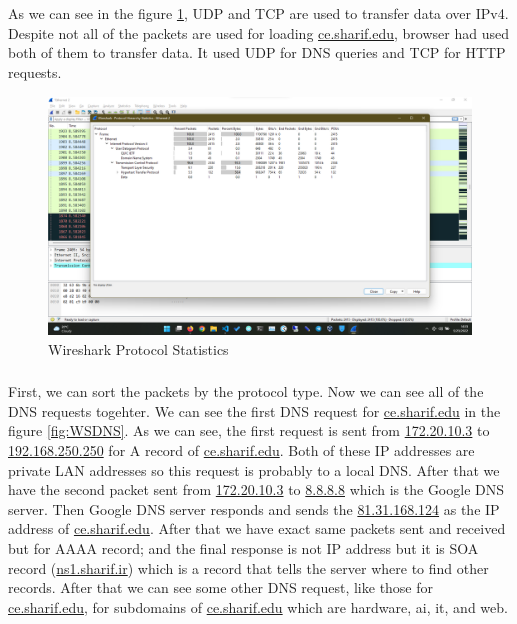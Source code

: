 \documentclass[en]{university}
\begin{document}
\setupdocument

\section{}
\subsection{}
\subsubsection{}
As we can see in the figure \ref{fig:WSProtocolStat}, UDP and TCP are used to transfer data over IPv4. Despite not all of the packets are used for loading \url{ce.sharif.edu}, browser had used both of them to transfer data. It used UDP for DNS queries and TCP for HTTP requests.

\begin{figure}
    \centering
    \includegraphics[width=\textwidth]{./resources/WSProtocolStat.png}
    \caption{Wireshark Protocol Statistics}
    \label{fig:WSProtocolStat}
\end{figure}

\subsubsection{}
First, we can sort the packets by the protocol type. Now we can see all of the DNS requests togehter. We can see the first DNS request for \url{ce.sharif.edu} in the figure \ref{fig:WSDNS}. As we can see, the first request is sent from \url{172.20.10.3} to \url{192.168.250.250} for A record of \url{ce.sharif.edu}. Both of these IP addresses are private LAN addresses so this request is probably to a local DNS. After that we have the second packet sent from \url{172.20.10.3} to \url{8.8.8.8} which is the Google DNS server. Then Google DNS server responds and sends the \url{81.31.168.124} as the IP address of \url{ce.sharif.edu}. After that we have exact same packets sent and received but for AAAA record; and the final response is not IP address but it is SOA record (\url{ns1.sharif.ir}) which is a record that tells the server where to find other records. After that we can see some other DNS request, like those for \url{ce.sharif.edu}, for subdomains of \url{ce.sharif.edu} which are hardware, ai, it, and web. 
\end{document}
